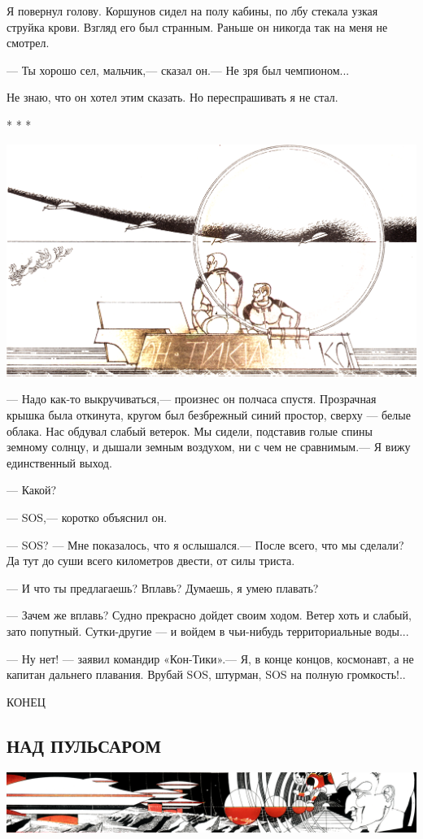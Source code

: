 \documentclass[11pt,a4paper,oneside]{article}
\begin{document}
Я повернул голову. Коршунов сидел на полу кабины, по лбу стекала узкая струйка крови. Взгляд его был странным. Раньше он никогда так на меня не смотрел.

— Ты хорошо сел, мальчик,— сказал он.— Не зря был чемпионом...

Не знаю, что он хотел этим сказать. Но переспрашивать я не стал.

* * *

\includegraphics[width=\textwidth]{sos2}

— Надо как-то выкручиваться,— произнес он полчаса спустя. Прозрачная крышка была откинута, кругом был безбрежный синий простор, сверху — белые облака. Нас обдувал слабый ветерок. Мы сидели, подставив голые спины земному солнцу, и дышали земным воздухом, ни с чем не сравнимым.— Я вижу единственный выход.

— Какой?

— SOS,— коротко объяснил он.

— SOS? — Мне показалось, что я ослышался.— После всего, что мы сделали? Да тут до суши всего километров двести, от силы триста.

— И что ты предлагаешь? Вплавь? Думаешь, я умею плавать?

— Зачем же вплавь? Судно прекрасно дойдет своим ходом. Ветер хоть и слабый, зато попутный. Сутки-другие — и войдем в чьи-нибудь территориальные воды...

— Ну нет! — заявил командир «Кон-Тики».— Я, в конце концов, космонавт, а не капитан дальнего плавания. Врубай SOS, штурман, SOS на полную громкость!..

КОНЕЦ

\subsection{НАД ПУЛЬСАРОМ}
\label{gravi}
\includegraphics[width=\textwidth]{pulsar}
\end{document}
